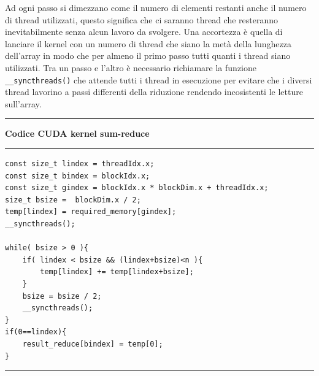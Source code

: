 \documentclass[12pt,a4paper]{report}
\begin{document}
\begin{figure}[H]
\centering
\begin{floatrow}[1]
\end{floatrow}
\end{figure} 
Ad ogni passo si dimezzano come il numero di elementi restanti anche il numero di thread utilizzati, questo significa che ci saranno thread che resteranno inevitabilmente senza alcun lavoro da svolgere. \newline
Una accortezza è quella di lanciare il kernel con un numero di thread che siano la metà della lunghezza dell'array in modo che per almeno il primo passo tutti quanti i thread siano utilizzati. \newline
Tra un passo e l'altro è necessario richiamare la funzione \verb|__syncthreads()| che attende tutti i thread in esecuzione per evitare che i diversi thread lavorino a passi differenti della riduzione rendendo incosistenti le letture sull'array.  \newpage
\noindent\rule[0.5ex]{\linewidth}{2pt}
\small{\textbf{Codice CUDA kernel sum-reduce}} \\
\noindent\rule[0.5ex]{\linewidth}{1pt}
\begin{lstlisting}
const size_t lindex = threadIdx.x;
const size_t bindex = blockIdx.x;
const size_t gindex = blockIdx.x * blockDim.x + threadIdx.x;
size_t bsize =  blockDim.x / 2;
temp[lindex] = required_memory[gindex];
__syncthreads();

while( bsize > 0 ){
    if( lindex < bsize && (lindex+bsize)<n ){
        temp[lindex] += temp[lindex+bsize];
    }
    bsize = bsize / 2;
    __syncthreads();
}
if(0==lindex){
    result_reduce[bindex] = temp[0];
} 
\end{lstlisting}
\noindent\rule[0.5ex]{\linewidth}{1pt} \\[10pt]
\end{document}
